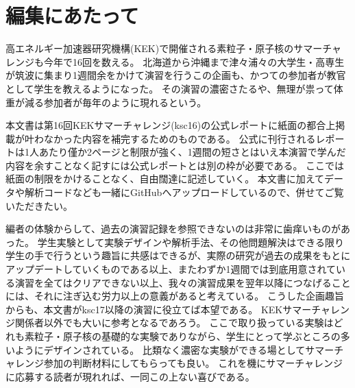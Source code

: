 \section*{編集にあたって}

高エネルギー加速器研究機構(KEK)で開催される素粒子・原子核のサマーチャレンジも今年で16回を数える。
北海道から沖縄まで津々浦々の大学生・高専生が筑波に集まり1週間余をかけて演習を行うこの企画も、かつての参加者が教官として学生を教えるようになった。
その演習の濃密さたるや、無理が祟って体重が減る参加者が毎年のように現れるという。

本文書は第16回KEKサマーチャレンジ(ksc16)の公式レポートに紙面の都合上掲載が叶わなかった内容を補完するためのものである。
公式に刊行されるレポートは1人あたり僅か2ページと制限が強く、1週間の短さとはいえ本演習で学んだ内容を余すことなく記すには公式レポートとは別の枠が必要である。
ここでは紙面の制限をかけることなく、自由闊達に記述していく。
本文書に加えてデータや解析コードなども一緒にGitHubへアップロードしているので、併せてご覧いただきたい。

編者の体験からして、過去の演習記録を参照できないのは非常に歯痒いものがあった。
学生実験として実験デザインや解析手法、その他問題解決はできる限り学生の手で行うという趣旨に共感はできるが、実際の研究が過去の成果をもとにアップデートしていくものである以上、またわずか1週間では到底用意されている演習を全てはクリアできない以上、我々の演習成果を翌年以降につなげることには、それに注ぎ込む労力以上の意義があると考えている。
こうした企画趣旨からも、本文書がksc17以降の演習に役立てば本望である。
KEKサマーチャレンジ関係者以外でも大いに参考となるであろう。
ここで取り扱っている実験はどれも素粒子・原子核の基礎的な実験でありながら、学生にとって学ぶところの多いようにデザインされている。
比類なく濃密な実験ができる場としてサマーチャレンジ参加の判断材料にしてもらっても良い。
これを機にサマーチャレンジに応募する読者が現れれば、一同この上ない喜びである。

\rightline{\today}

